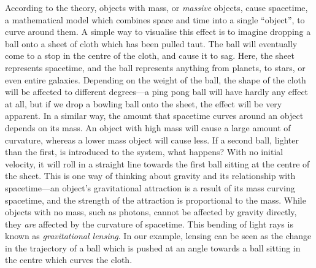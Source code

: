 \documentclass[a4paper,11pt]{article}
\begin{document}
   According to the theory, objects with mass, or \emph{massive} objects, cause
   spacetime, a mathematical model which combines space and time into a single
   ``object'', to curve around them. A simple way to visualise this effect is to
   imagine dropping a ball onto a sheet of cloth which has been pulled taut. The
   ball will eventually come to a stop in the centre of the cloth, and cause it
   to sag. Here, the sheet represents spacetime, and the ball represents
   anything from planets, to stars, or even entire galaxies. Depending on the
   weight of the ball, the shape of the cloth will be affected to different
   degrees---a ping pong ball will have hardly any effect at all, but if we drop
   a bowling ball onto the sheet, the effect will be very apparent. In a similar
   way, the amount that spacetime curves around an object depends on its
   mass. An object with high mass will cause a large amount of curvature,
   whereas a lower mass object will cause less. If a second ball, lighter than
   the first, is introduced to the system, what happens?  With no initial
   velocity, it will roll in a straight line towards the first ball sitting at
   the centre of the sheet. This is one way of thinking about gravity and its
   relationship with spacetime---an object's gravitational attraction is a
   result of its mass curving spacetime, and the strength of the attraction is
   proportional to the mass. While objects with no mass, such as photons, cannot
   be affected by gravity directly, they \emph{are} affected by the curvature of
   spacetime. This bending of light rays is known as \emph{gravitational
   lensing}. In our example, lensing can be seen as the change in the trajectory
   of a ball which is pushed at an angle towards a ball sitting in the centre
   which curves the cloth.
\end{document}
